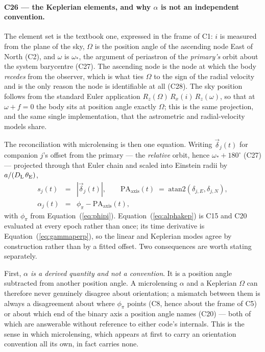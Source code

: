 \paragraph{C26 --- the Keplerian elements, and why $\alpha$ is not an
independent convention.}  The element set is the textbook one, expressed in
the frame of C1: $i$ is measured from the plane of the sky, $\Omega$ is the
position angle of the ascending node East of North (C2), and $\omega$ is
$\omega_*$, the argument of periastron of the \emph{primary's} orbit about
the system barycentre (C27).  The ascending node is the node at which the
body \emph{recedes} from the observer, which is what ties $\Omega$ to the
sign of the radial velocity and is the only reason the node is identifiable
at all (C28).  The sky position follows from the standard Euler application
$R_z(\Omega)\,R_x(i)\,R_z(\omega)$, so that at $\omega + f = 0$ the body
sits at position angle exactly $\Omega$; this is the same projection, and
the same single implementation, that the astrometric and radial-velocity
models share.

The reconciliation with microlensing is then one equation.  Writing
$\vec{\delta}_j(t)$ for companion $j$'s offset from the primary --- the
\emph{relative} orbit, hence $\omega_* + 180^\circ$ (C27) --- projected
through that Euler chain and scaled into Einstein radii by
$a/(D_{\rm L}\,\theta_{\rm E})$,
\begin{eqnarray}
  s_j(t)  &=& |\vec{\delta}_j(t)|, \qquad
  \mathrm{PA_{axis}}(t) \;=\; \mathrm{atan2}(\delta_{j,E}, \delta_{j,N}),
  \nonumber \\
  \alpha_j(t) &=& \phi_\pi - \mathrm{PA_{axis}}(t),
  \label{eq:alphakep}
\end{eqnarray}
with $\phi_\pi$ from Equation~(\ref{eq:phipi}).  Equation~(\ref{eq:alphakep})
is C15 and C20 evaluated at every epoch rather than once; its time
derivative is Equation~(\ref{eq:gammaperp}), so the linear and Keplerian
modes agree by construction rather than by a fitted offset.  Two
consequences are worth stating separately.

First, \emph{$\alpha$ is a derived quantity and not a convention}.  It is a
position angle subtracted from another position angle.  A microlensing
$\alpha$ and a Keplerian $\Omega$ can therefore never genuinely disagree
about orientation; a mismatch between them is always a disagreement about
where $\phi_\pi$ points (C8, hence about the frame of C5) or about which
end of the binary axis a position angle names (C20) --- both of which are
answerable without reference to either code's internals.  This is the
sense in which microlensing, which appears at first to carry an orientation
convention all its own, in fact carries none.

